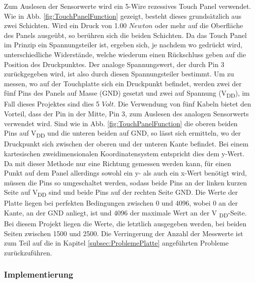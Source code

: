 \documentclass[12pt,a4paper,bibliography=totoc,listof=totoc]{scrartcl}
\begin{document}
Zum Auslesen der Sensorwerte wird ein 5-Wire rezessives Touch Panel verwendet.\newline
Wie in Abb. \ref{fig:TouchPanelFunction} \cite {wikipdeia} gezeigt, besteht dieses grundsätzlich aus zwei Schichten. Wird ein Druck von 1.00 $Newton$ oder mehr auf die Oberfläche des Panels ausgeübt, so berühren sich die beiden Schichten. Da das Touch Panel im Prinzip ein Spannungsteiler ist, ergeben sich, je nachdem wo gedrückt wird, unterschiedliche Widerstände, welche wiederum einen Rückschluss geben auf die Position des Druckpunktes. Der analoge Spannungswert, der durch Pin 3 zurückgegeben wird, ist also durch diesen Spannungsteiler bestimmt.\newline
Um zu messen, wo auf der Touchplatte sich ein Druckpunkt befindet, werden zwei der fünf Pins des Panels auf Masse (GND) gesetzt und zwei auf Spannung (V\textsubscript{DD}), im Fall dieses Projektes sind dies 5 $Volt$. Die Verwendung von fünf Kabeln bietet den Vorteil, dass der Pin in der Mitte, Pin 3, zum Auslesen des analogen Sensorwerts verwendet wird.
Sind wie in Abb. \ref{fig:TouchPanelFunction} die oberen beiden Pins auf V\textsubscript{DD} und die unteren beiden auf GND, so lässt sich ermitteln, wo der Druckpunkt sich zwischen der oberen und der unteren Kante befindet. Bei einem kartesischen zweidimensionalen Koordinatensystem entspricht dies dem y-Wert.
Da mit dieser Methode nur eine Richtung gemessen werden kann, für einen Punkt auf dem Panel allerdings sowohl ein y- als auch ein x-Wert benötigt wird, müssen die Pins so umgeschaltet werden, sodass beide Pins an der linken kurzen Seite auf V\textsubscript{DD} sind und beide Pins auf der rechten Seite GND.\newline
Die Werte der Platte liegen bei perfekten Bedingungen zwischen  0 und 4096, wobei 0 an der Kante, an der GND anliegt, ist und 4096 der maximale Wert an der V \textsubscript{DD}-Seite. Bei diesem Projekt liegen die Werte, die letztlich ausgegeben werden, bei beiden Seiten zwischen 1500 und 2500. Die Verringerung der Anzahl der Messwerte ist zum Teil auf die in Kapitel \ref{subsec:ProblemePlatte} angeführten Probleme zurückzuführen.

\subsubsection{Implementierung}
\end{document}
